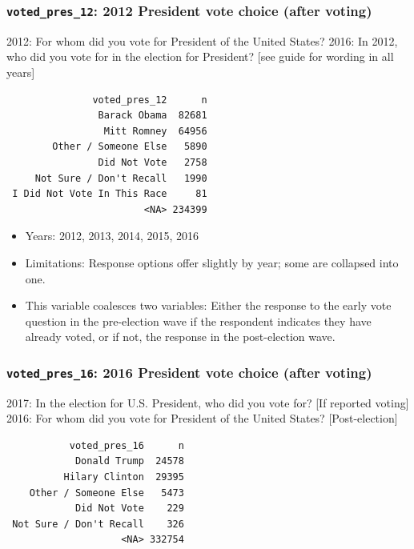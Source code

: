 \documentclass[10pt,article,oneside]{memoir}
\theoremstyle{definition}
\begin{document}
\hypertarget{voted_pres_12-2012-president-vote-choice-after-voting}{%
\subsubsection{\texorpdfstring{\texttt{voted\_pres\_12}: 2012 President
vote choice (after
voting)}{voted\_pres\_12: 2012 President vote choice (after voting)}}\label{voted_pres_12-2012-president-vote-choice-after-voting}}

2012: For whom did you vote for President of the United States? 2016: In
2012, who did you vote for in the election for President? {[}see guide
for wording in all years{]}

\begin{verbatim}
               voted_pres_12      n
                Barack Obama  82681
                 Mitt Romney  64956
        Other / Someone Else   5890
                Did Not Vote   2758
     Not Sure / Don't Recall   1990
 I Did Not Vote In This Race     81
                        <NA> 234399
\end{verbatim}

\begin{itemize}
\tightlist
\item
  Years: 2012, 2013, 2014, 2015, 2016
\item
  Limitations: Response options offer slightly by year; some are
  collapsed into one.
\item
  This variable coalesces two variables: Either the response to the
  early vote question in the pre-election wave if the respondent
  indicates they have already voted, or if not, the response in the
  post-election wave.
\end{itemize}

\hypertarget{voted_pres_16-2016-president-vote-choice-after-voting}{%
\subsubsection{\texorpdfstring{\texttt{voted\_pres\_16}: 2016 President
vote choice (after
voting)}{voted\_pres\_16: 2016 President vote choice (after voting)}}\label{voted_pres_16-2016-president-vote-choice-after-voting}}

2017: In the election for U.S. President, who did you vote for? {[}If
reported voting{]} 2016: For whom did you vote for President of the
United States? {[}Post-election{]}

\begin{verbatim}
           voted_pres_16      n
            Donald Trump  24578
          Hilary Clinton  29395
    Other / Someone Else   5473
            Did Not Vote    229
 Not Sure / Don't Recall    326
                    <NA> 332754
\end{verbatim}
\end{document}
